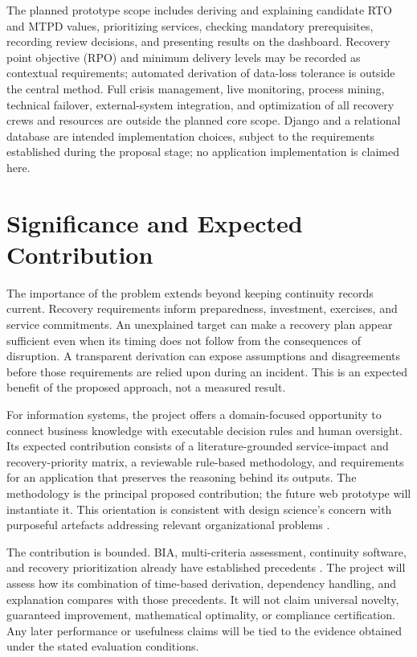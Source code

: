 The planned prototype scope includes deriving and explaining candidate RTO and MTPD values, prioritizing services, checking mandatory prerequisites, recording review decisions, and presenting results on the dashboard. Recovery point objective (RPO) and minimum delivery levels may be recorded as contextual requirements; automated derivation of data-loss tolerance is outside the central method. Full crisis management, live monitoring, process mining, technical failover, external-system integration, and optimization of all recovery crews and resources are outside the planned core scope. Django and a relational database are intended implementation choices, subject to the requirements established during the proposal stage; no application implementation is claimed here.

\section{Significance and Expected Contribution}
\label{sec:intro-significance}

The importance of the problem extends beyond keeping continuity records current. Recovery requirements inform preparedness, investment, exercises, and service commitments. An unexplained target can make a recovery plan appear sufficient even when its timing does not follow from the consequences of disruption. A transparent derivation can expose assumptions and disagreements before those requirements are relied upon during an incident. This is an expected benefit of the proposed approach, not a measured result.

For information systems, the project offers a domain-focused opportunity to connect business knowledge with executable decision rules and human oversight. Its expected contribution consists of a literature-grounded service-impact and recovery-priority matrix, a reviewable rule-based methodology, and requirements for an application that preserves the reasoning behind its outputs. The methodology is the principal proposed contribution; the future web prototype will instantiate it. This orientation is consistent with design science's concern with purposeful artefacts addressing relevant organizational problems \cite{hevner2004design}.

The contribution is bounded. BIA, multi-criteria assessment, continuity software, and recovery prioritization already have established precedents \cite{torabi2014bia,idrees2019bcis,podaras2016tools}. The project will assess how its combination of time-based derivation, dependency handling, and explanation compares with those precedents. It will not claim universal novelty, guaranteed improvement, mathematical optimality, or compliance certification. Any later performance or usefulness claims will be tied to the evidence obtained under the stated evaluation conditions.

